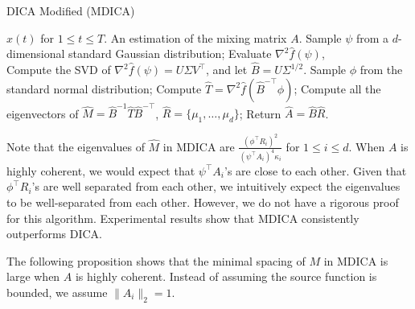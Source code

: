 \documentclass[twoside,11pt]{article}
\begin{document}
\begin{algorithm} 
\caption{DICA Modified (MDICA)}
\label{alg:DICA_Mod}
\begin{algorithmic}[1]
\INPUT $x(t)$ for $1\le t \le T$. 
\OUTPUT An estimation of the mixing matrix $A$. 
\STATE Sample $\psi$ from a $d$-dimensional standard Gaussian distribution;
\STATE Evaluate $\nabla^2\hat{f}(\psi)$, \\
\STATE Compute the SVD of $\nabla^2\hat{f}(\psi) = U \Sigma V^{\top}$, and let $\hat{B} =  U \Sigma^{1/2}$.
\STATE Sample $\phi$ from the standard normal distribution;
\STATE Compute $\hat{T} = \nabla^2 \hat{f}(\hat{B}^{-\top}\phi)$;
\STATE Compute all the eigenvectors of $\hat{M} = \hat{B}^{-1}\hat{T}\hat{B}^{-\top}$, $\hat{R} = \{\mu_1,\ldots,\mu_d\}$;
\STATE Return $\hat{A} = \hat{B}\hat{R}$.
\end{algorithmic}
\end{algorithm}
\begin{remark}
\label{rmk:DICA_Mod}
Note that the eigenvalues of $\hat{M}$ in MDICA are $\frac{(\phi^{\top}R_i)^2}{(\psi^{\top}A_i)^4\kappa_i}$ for $1\le i\le d$. 
When $A$ is highly coherent, we would expect that $\psi^{\top}A_i$'s are close to each other. 
Given that $\phi^{\top}R_i$'s are well separated from each other, we intuitively expect the eigenvalues to be well-separated from each other. 
However, we do not have a rigorous proof for this algorithm.
Experimental results show that MDICA consistently outperforms DICA. 

\end{remark}
The following proposition shows that the minimal spacing of $M$ in MDICA is large when $A$ is highly coherent. Instead of assuming the source function is bounded, we assume $\|A_i\|_2 = 1$.
\end{document}
